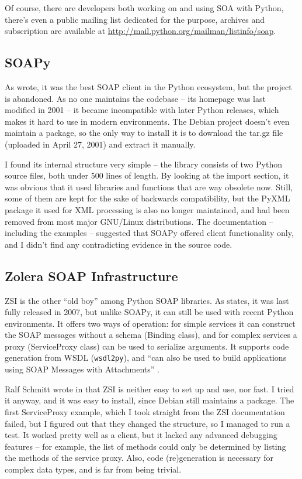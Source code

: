 Of course, there are developers both working on and using SOA with Python, there's even a public mailing list dedicated for the purpose, archives and subscription are available at \url{http://mail.python.org/mailman/listinfo/soap}.

\subsection{SOAPy}

As \cite{so-206154} wrote, it was the best SOAP client in the Python ecosystem, but the project is abandoned. As no one maintains the codebase -- its homepage was last modified in 2001 -- it became incompatible with later Python releases, which makes it hard to use in modern environments. The Debian project doesn't even maintain a package, so the only way to install it is to download the tar.gz file (uploaded in April 27, 2001) and extract it manually.

I found its internal structure very simple -- the library consists of two Python source files, both under 500 lines of length. By looking at the import section, it was obvious that it used libraries and functions that are way obsolete now. Still, some of them are kept for the sake of backwards compatibility, but the PyXML package it used for XML processing is also no longer maintained, and had been removed from most major GNU/Linux distributions. The documentation -- including the examples -- suggested that SOAPy offered client functionality only, and I didn't find any contradicting evidence in the source code.

\subsection{Zolera SOAP Infrastructure}
\label{ZSI}

ZSI is the other ``old boy'' among Python SOAP libraries. As \cite{pywebsvcs-talk} states, it was last fully released in 2007, but unlike SOAPy, it can still be used with recent Python environments. It offers two ways of operation: for simple services it can construct the SOAP messages without a schema (Binding class), and for complex services a proxy (ServiceProxy class) can be used to serialize arguments. It supports code generation from WSDL (\verb|wsdl2py|), and ``can also be used to build applications using SOAP Messages with Attachments'' \cite{zsi-doc}.

Ralf Schmitt wrote in \cite{zsi-velocity} that ZSI is neither easy to set up and use, nor fast. I tried it anyway, and it was easy to install, since Debian still maintains a package. The first ServiceProxy example, which I took straight from the ZSI documentation failed, but I figured out that they changed the structure, so I managed to run a test. It worked pretty well as a client, but it lacked any advanced debugging features -- for example, the list of methods could only be determined by listing the methods of the service proxy. Also, code (re)generation is necessary for complex data types, and is far from being trivial.

